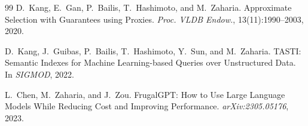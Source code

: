 \documentclass[11pt]{article}
\begin{document}
\begin{thebibliography}{99}
D.~Kang, E.~Gan, P.~Bailis, T.~Hashimoto, and M.~Zaharia.
\newblock Approximate Selection with Guarantees using Proxies.
\newblock \emph{Proc. VLDB Endow.}, 13(11):1990--2003, 2020.

D.~Kang, J.~Guibas, P.~Bailis, T.~Hashimoto, Y.~Sun, and M.~Zaharia.
\newblock TASTI: Semantic Indexes for Machine Learning-based Queries over Unstructured Data.
\newblock In \emph{SIGMOD}, 2022.

L.~Chen, M.~Zaharia, and J.~Zou.
\newblock FrugalGPT: How to Use Large Language Models While Reducing Cost and Improving Performance.
\newblock \emph{arXiv:2305.05176}, 2023.

\end{thebibliography}
\end{document}
